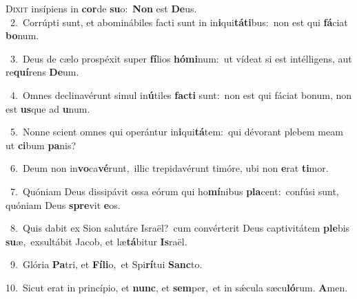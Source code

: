 \lettrine{\initial\textcolor{\initialcolor}{D}}{ixit} insípiens in \textbf{cor}\-de \textbf{su}\-o:~\star \textbf{Non} est \textbf{De}\-us.\\
{\numbfont\textcolor{\numbcolor}{~2.}}~Corrúpti sunt, et abominábiles facti sunt in in\-\textbf{i}\-qui\-\textbf{tá}\-\textbf{ti}bus:~\star non est qui \textbf{fá}\-ciat \textbf{bo}\-num.\par
{\numbfont\textcolor{\numbcolor}{~3.}}~Deus de cælo prospéxit super \textbf{fí}\-lios \textbf{hó}\-\textbf{mi}num:~\star ut vídeat si est intélligens, aut re\-\textbf{quí}\-rens \textbf{De}\-um.\par
{\numbfont\textcolor{\numbcolor}{~4.}}~Omnes declinavérunt simul in\-\textbf{ú}\-tiles \textbf{fac}\-\textbf{ti} sunt:~\star non est qui fáciat bonum, non est \textbf{us}\-que ad \textbf{u}\-num.\par
{\numbfont\textcolor{\numbcolor}{~5.}}~Nonne scient omnes qui operántur in\-\textbf{i}\-qui\-\textbf{tá}\-tem:~\star qui dévorant plebem meam ut \textbf{ci}\-bum \textbf{pa}\-nis?\par
{\numbfont\textcolor{\numbcolor}{~6.}}~Deum non in\-\textbf{vo}\-ca\-\textbf{vé}\-runt,~\star illic trepidavérunt timóre, ubi non \textbf{e}\-rat \textbf{ti}\-mor.\par
{\numbfont\textcolor{\numbcolor}{~7.}}~Quóniam Deus dissipávit ossa eórum qui ho\-\textbf{mí}\-nibus \textbf{pla}\-cent:~\star confúsi sunt, quóniam Deus \textbf{spre}\-vit \textbf{e}\-os.\par
{\numbfont\textcolor{\numbcolor}{~8.}}~Quis dabit ex Sion salutáre Israël?~\dagger cum convérterit Deus captivitátem \textbf{ple}\-bis \textbf{su}\-æ,~\star exsultábit Jacob, et læ\-\textbf{tá}\-bitur \textbf{Is}\-raël.\par
{\numbfont\textcolor{\numbcolor}{~9.}}~Glória \textbf{Pa}\-tri, et \textbf{Fí}\-\textbf{li}o,~\star et Spi\-\textbf{rí}\-tui \textbf{Sanc}\-to.\par
{\numbfont\textcolor{\numbcolor}{10.}}~Sicut erat in princípio, et \textbf{nunc}\-, et \textbf{sem}\-per,~\star et in sǽcula sæcu\-\textbf{ló}\-rum. \textbf{A}\-men.\par
